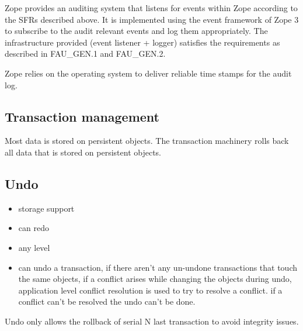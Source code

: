 \documentclass[10pt,a4paper,english]{article}
\begin{document}
Zope provides an auditing system that listens for events within Zope according
to the SFRs described above. It is implemented using the event framework of
Zope 3 to subscribe to the audit relevant events and log them appropriately.
The infrastructure provided (event listener + logger) satisfies the
requirements as described in FAU{\_}GEN.1 and FAU{\_}GEN.2.

Zope relies on the operating system to deliver reliable time stamps for the
audit log.



\hypertarget{transaction-management}{}
\subsection*{Transaction management}

Most data is stored on persistent objects. The transaction machinery rolls back
all data that is stored on persistent objects.



\hypertarget{undo}{}
\subsection*{Undo}
\begin{itemize}
\item {} 
storage support

\item {} 
can redo

\item {} 
any level

\item {} 
can undo a transaction, if there aren't any un-undone transactions that touch
the same objects, if a conflict arises while changing the objects during
undo, application level conflict resolution is used to try to resolve a
conflict. if a conflict can't be resolved the undo can't be done.

\end{itemize}

Undo only allows the rollback of serial N last transaction to avoid integrity issues.



\hypertarget{publication-server}{}
\end{document}
